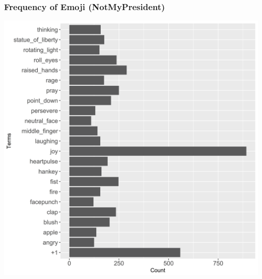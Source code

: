 \documentclass{beamer}
\begin{document}
\begin{frame}
	\frametitle{Frequency of Emoji (NotMyPresident)}
  \includegraphics[height = 0.9\textheight]{nmpemoji}
\end{frame}

\end{document}
